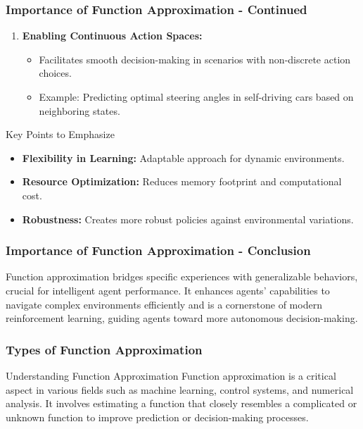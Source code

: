 \documentclass[aspectratio=169]{beamer}
\begin{document}
\begin{frame}[fragile]
    \frametitle{Importance of Function Approximation - Continued}
    \begin{enumerate}[resume]
        \item \textbf{Enabling Continuous Action Spaces:}
            \begin{itemize}
                \item Facilitates smooth decision-making in scenarios with non-discrete action choices.
                \item Example: Predicting optimal steering angles in self-driving cars based on neighboring states.
            \end{itemize}
    \end{enumerate}

    \begin{block}{Key Points to Emphasize}
        \begin{itemize}
            \item \textbf{Flexibility in Learning:} Adaptable approach for dynamic environments.
            \item \textbf{Resource Optimization:} Reduces memory footprint and computational cost.
            \item \textbf{Robustness:} Creates more robust policies against environmental variations.
        \end{itemize}
    \end{block}
\end{frame}

\begin{frame}[fragile]
    \frametitle{Importance of Function Approximation - Conclusion}
    Function approximation bridges specific experiences with generalizable behaviors, crucial for intelligent agent performance. It enhances agents' capabilities to navigate complex environments efficiently and is a cornerstone of modern reinforcement learning, guiding agents toward more autonomous decision-making.
\end{frame}

\begin{frame}[fragile]
    \frametitle{Types of Function Approximation}
    \begin{block}{Understanding Function Approximation}
        Function approximation is a critical aspect in various fields such as machine learning, control systems, and numerical analysis. 
        It involves estimating a function that closely resembles a complicated or unknown function to improve prediction or decision-making processes.
    \end{block}
\end{frame}
\end{document}
